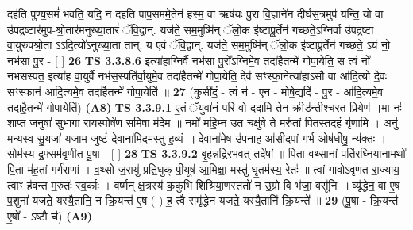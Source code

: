 \documentclass[17pt]{extarticle}
\begin{document}
                  दह॑ति पुण्य॒समं॑ भवति॒ यदि॒ न दह॑ति पाप॒सम॑मे॒तेन॑ हस्म॒ वा ऋष॑यः पु॒रा वि॒ज्ञाने॑न दीर्घस॒त्रमुप॑ यन्ति॒ यो वा उ॑पद्र॒ष्टार॑मुप-श्रो॒तार॑मनुख्या॒तारं॑ ॅवि॒द्वान्. यज॑ते॒ सम॒मुष्मि॑न् ॅलो॒क इ॑ष्टापू॒र्तेन॑ गच्छते॒ऽग्निर्वा उ॑पद्र॒ष्टा वा॒युरु॑पश्रो॒ता ऽऽदि॒त्यो॑ऽनुख्या॒ता तान्. य ए॒वं ॅवि॒द्वान्. यज॑ते॒ सम॒मुष्मि॑न् ॅलो॒क इ॑ष्टापू॒र्तेन॑ गच्छते॒ ऽयं नो॒ नभ॑सा पु॒र - [  ] \textbf{  26} \newline
                  \newline
                                \textbf{ TS 3.3.8.6} \newline
                  इत्या॑हा॒ग्निर्वै नभ॑सा पु॒रो᳚ऽग्निमे॒व तदा॑है॒तन्मे॑ गोपा॒येति॒ स त्वं नो॑ नभसस्पत॒ इत्या॑ह वा॒युर्वै नभ॑स॒स्पति॑र्वा॒युमे॒व तदा॑है॒तन्मे॑ गोपा॒येति॒ देव॑ सꣳस्फा॒नेत्या॑हा॒ऽसौ वा आ॑दि॒त्यो दे॒वः सꣳ॒॒स्फान॑ आदि॒त्यमे॒व तदा॑है॒तन्मे॑ गोपा॒येति॑ ॥ \textbf{  27} \newline
                  \newline
                      (कुसी॑दं॒ - त्वं न॑ - एन - मोषे॒द्यदि॑ - पु॒र - आ॑दि॒त्यमे॒व तदा॑है॒तन्मे॑ गोपा॒येति॑)  \textbf{(A8)} \newline \newline
                                        \textbf{ TS 3.3.9.1} \newline
                  ए॒तं ॅयुवा॑नं॒ परि॑ वो ददामि॒ तेन॒ क्रीड॑न्तीश्चरत प्रि॒येण॑ ।मा नः॑ शाप्त ज॒नुषा॑ सुभागा रा॒यस्पोषे॑ण॒ समि॒षा म॑देम ॥ नमो॑ महि॒म्न उ॒त चक्षु॑षे ते॒ मरु॑तां पित॒स्तद॒हं गृ॑णामि । अनु॑ मन्यस्व सु॒यजा॑ यजाम॒ जुष्टं॑ दे॒वाना॑मि॒दम॑स्तु ह॒व्यं ॥ दे॒वाना॑मे॒ष उ॑पना॒ह आ॑सीद॒पां गर्भ॒ ओष॑धीषु॒ न्य॑क्तः । सोम॑स्य द्र॒फ्सम॑वृणीत पू॒षा - [  ] \textbf{  28} \newline
                  \newline
                                \textbf{ TS 3.3.9.2} \newline
                  बृ॒हन्नद्रि॑रभव॒त् तदे॑षां ॥ पि॒ता व॒थ्सानां॒ पति॑रघ्नि॒याना॒मथो॑ पि॒ता म॑ह॒तां गर्ग॑राणां । व॒थ्सो ज॒रायु॑ प्रति॒धुक् पी॒यूष॑ आ॒मिक्षा॒ मस्तु॑ घृ॒तम॑स्य॒ रेतः॑ ॥ त्वां गावो॑ऽवृणत रा॒ज्याय॒ त्वाꣳ ह॑वन्त म॒रुतः॑ स्व॒र्काः । वर्ष्म॑न् क्ष॒त्रस्य॑ क॒कुभि॑ शिश्रिया॒णस्ततो॑ न उ॒ग्रो वि भ॑जा॒ वसू॑नि ॥ व्यृ॑द्धेन॒ वा ए॒ष प॒शुना॑ यजते॒ यस्यै॒तानि॒ न क्रि॒यन्त॑ ए॒ष ( ) ह॒ त्वै समृ॑द्धेन यजते॒ यस्यै॒तानि॑ क्रि॒यन्ते᳚ ॥ \textbf{  29} \newline
                  \newline
                      (पू॒षा - क्रि॒यन्त॑ ए॒षो᳚ - ऽष्टौ च॑)  \textbf{(A9)} \newline \newline
\end{document}
